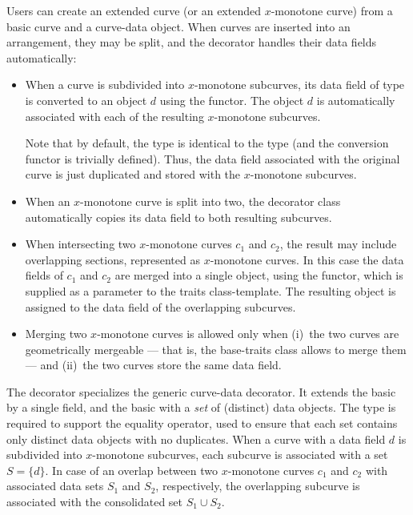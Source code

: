 Users can create an extended curve (or an extended $x$-monotone
curve) from a basic curve and a curve-data object. When curves are
inserted into an arrangement, they may be split, and the
decorator handles their data fields automatically:
\begin{itemize}
\item When a curve is subdivided into $x$-monotone subcurves, its
data field of type  is converted to an 
object $d$ using the  functor. The object $d$ is automatically
associated with each of the resulting $x$-monotone subcurves.

Note that by default, the  type is identical to the
 type (and the conversion functor 
is trivially defined). Thus, the data field associated with the original
curve is just duplicated and stored with the $x$-monotone subcurves.
%
\item When an $x$-monotone curve is split into two, the decorator
class automatically copies its data field to both resulting subcurves.
%
\item When intersecting two $x$-monotone curves $c_1$ and $c_2$, the
result may include overlapping sections, represented as
$x$-monotone curves. In this case the data fields of $c_1$ and $c_2$
are merged into a single  object,
using the  functor, which is supplied as a
parameter to the traits class-template. The resulting object is
assigned to the data field of the overlapping subcurves.
%
\item Merging two $x$-monotone curves is allowed only when (i)~the two
curves are geometrically mergeable --- that is, the base-traits class
allows to merge them --- and (ii)~the two curves store the same data field.
\end{itemize}

The  decorator
specializes the generic curve-data decorator. It extends the basic
 by a single  field, and the basic
 with a {\em set} of (distinct) data 
objects. The  type is required to support the equality operator, 
used to ensure that each set contains only distinct data objects with no 
duplicates.
When a curve with a data field $d$ is subdivided into $x$-monotone subcurves,
each subcurve is associated with a set $S = \{ d \}$. In case of an overlap
between two $x$-monotone curves $c_1$ and $c_2$ with associated data sets
$S_1$ and $S_2$, respectively, the overlapping subcurve is associated with
the consolidated set $S_1 \cup S_2$.

